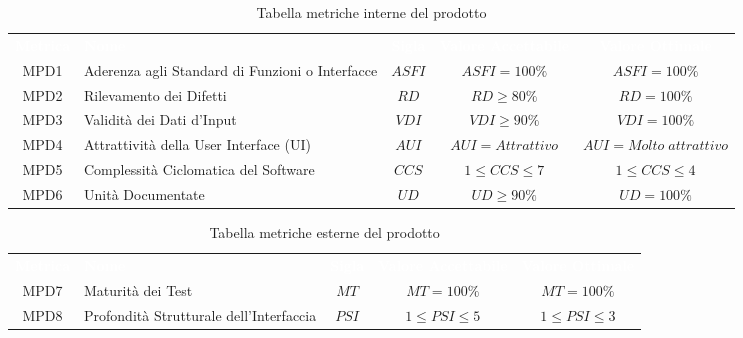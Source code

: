 \renewcommand{\arraystretch}{1.5}
\begin{longtable}{ c C{4cm} c c c}
\caption{Tabella metriche interne del prodotto}\\
\textcolor{white}{\textbf{Metrica}} & \textcolor{white}{\textbf{Nome}} & \textcolor{white}{\textbf{Sigla}} & \textcolor{white}{\textbf{Valore Accettabile}} & \textcolor{white}{\textbf{Valore Ottimale}}\\
    MPD1 & Aderenza agli Standard di Funzioni o Interfacce & $ASFI$ & $ASFI = 100\%$ & $ASFI = 100\%$\\
    MPD2 & Rilevamento dei Difetti & $RD$ & $ RD \geq 80\% $ & $RD = 100\%$\\
    MPD3 & Validità dei Dati d'Input & $VDI$ &  $VDI \geq 90\%$ &  $VDI = 100\%$\\
    MPD4 & Attrattività della User Interface (UI) & $AUI$ & $AUI = Attrattivo$ &  $AUI = Molto \; attrattivo$\\
    MPD5 & Complessità Ciclomatica del Software & $CCS $ & $1 \leq CCS \leq 7 $ & $1 \leq CCS \leq 4$\\
    MPD6 & Unità Documentate & $UD$ & $UD \geq 90\%$ & $UD = 100\%$\\
\end{longtable} 

\newpage %

\renewcommand{\arraystretch}{1.5}
\begin{longtable}{ c C{4cm} c c c}
\caption{Tabella metriche esterne del prodotto}\\
\textcolor{white}{\textbf{Metrica}} & \textcolor{white}{\textbf{Nome}} & \textcolor{white}{\textbf{Sigla}} & \textcolor{white}{\textbf{Valore Accettabile}} & \textcolor{white}{\textbf{Valore Ottimale}}\\
    MPD7 & Maturità dei Test & $MT$ & $MT = 100\%$ & $MT = 100\%$\\
    MPD8 & Profondità Strutturale dell'Interfaccia & $PSI$ & $1 \leq PSI \leq 5$ &$1 \leq PSI \leq 3$\\
\end{longtable}
